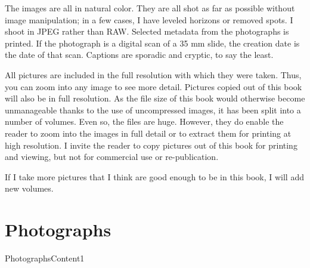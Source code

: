 \documentclass[10pt,letter,oneside]{book}
\begin{document}
The images are all in natural color. They are all shot as far as possible without image manipulation; in a few cases, I have leveled horizons or removed spots. I shoot in JPEG rather than RAW. Selected metadata from the photographs is printed. If the photograph is a digital scan of a 35 mm slide, the creation date is the date of that scan. Captions are sporadic and cryptic, to say the least.

All pictures are included in the full resolution with which they were taken. Thus, you can zoom into any image to see more detail. Pictures copied out of this book will also be in full resolution. As the file size of this book would otherwise become unmanageable thanks to the use of uncompressed images, it has been split into a number of volumes. Even so, the files are huge. However, they do enable the reader to zoom into the images in full detail or to extract them for printing at high resolution. I invite the reader to copy pictures out of this book for printing and viewing, but not for commercial use or re-publication. 

If I take more pictures that I think are good enough to be in this book, I will add new volumes.

\chapter{Photographs}

 {PhotographsContent1}
\end{document}

